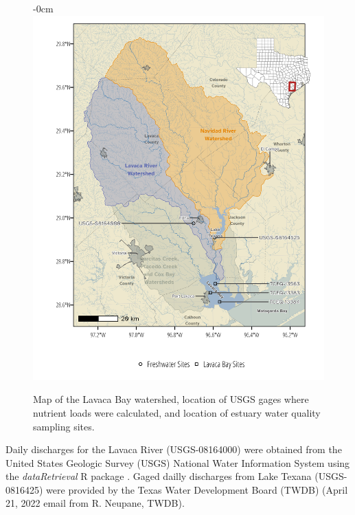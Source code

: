 \documentclass[water,article,submit,oneauthor]{Definitions/mdpi}
\begin{document}
\begin{figure}[H]
\begin{adjustwidth}{-\extralength}{0cm}
\centering
\includegraphics[width=15.5cm]{Schramm-Manuscript-2023_files/figure-latex/fig1-1.png}
\end{adjustwidth}
\caption{Map of the Lavaca Bay watershed, location of USGS gages where nutrient loads were calculated, and location of estuary water quality sampling sites.\label{fig1}}
\end{figure}

Daily discharges for the Lavaca River (USGS-08164000) were obtained from
the United States Geologic Survey (USGS) National Water Information
System using the \emph{dataRetrieval} R package
\citep{deciccoDataRetrievalPackagesDiscovering2022}. Gaged dailly
discharges from Lake Texana (USGS-0816425) were provided by the Texas
Water Development Board (TWDB) (April 21, 2022 email from R. Neupane,
TWDB).
\end{document}
